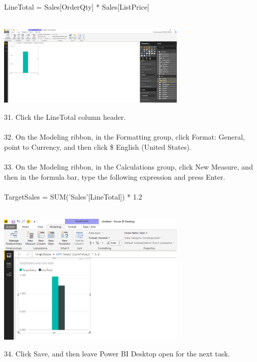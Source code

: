 \documentclass[12pt,letterpaper]{article}
\begin{document}
LineTotal = Sales[OrderQty] * Sales[ListPrice]\\\\
\begin{center}
\includegraphics[width=9cm]{IMG/12.png} 
\end{center}
31. Click the LineTotal column header.\\\\
32. On the Modeling ribbon, in the Formatting group, click Format: General, point to Currency, and then click \$ English (United States).\\\\
33. On the Modeling ribbon, in the Calculations group, click New Measure, and then in the formula bar, type the following expression and press Enter.\\\\
TargetSales = SUM('Sales'[LineTotal]) * 1.2\\\\
\begin{center}
\includegraphics[width=9cm]{IMG/14.png} 
\end{center}
34. Click Save, and then leave Power BI Desktop open for the next task.\\\\
\end{document}
